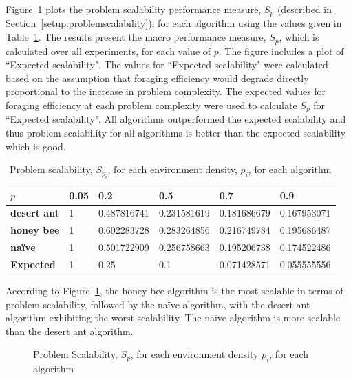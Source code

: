Figure~\ref{fig:problemscalability} plots the problem scalability performance measure, $S_p$ (described in Section~\ref{setup:problemscalability}), for each algorithm using the values given in Table~\ref{table:problemscalability}. The results present the macro performance measure, $S_p$, which is calculated over all experiments, for each value of $p$. The figure includes a plot of ``Expected scalability". The values for ``Expected scalability" were calculated based on the assumption that foraging efficiency would degrade directly proportional to the increase in problem complexity. The expected values for foraging efficiency at each problem complexity were used to calculate $S_p$ for ``Expected scalability". All algorithms outperformed the expected scalability and thus problem scalability for all algorithms is better than the expected scalability which is good. 


\begin{table}[!htbp]
    \centering
    \caption{Problem scalability, $S_{p_i}$, for each environment density, $p_i$, for each algorithm}
    \label{table:problemscalability}
    \begin{tabular}{@{}llllll@{}}
    \toprule
    \textbf{$p$}                  & \textbf{0.05} & \textbf{0.2        } & \textbf{0.5}         & \textbf{0.7}         & \textbf{0.9}         \\ \midrule
    \textbf{desert ant}           & 1    & 0.487816741 & 0.231581619 & 0.181686679 & 0.167953071 \\
    \textbf{honey bee}            & 1    & 0.602283728 & 0.283264856 & 0.216749784 & 0.195686487 \\
    \textbf{na\"ive}              & 1    & 0.501722909 & 0.256758663 & 0.195206738 & 0.174522486 \\
    \textbf{Expected} & 1    & 0.25        & 0.1         & 0.071428571 & 0.055555556 \\ \bottomrule
    \end{tabular}
\end{table}

According to Figure~\ref{fig:problemscalability}, the honey bee algorithm is the most scalable in terms of problem scalability, followed by the na\"ive algorithm, with the desert ant algorithm exhibiting the worst scalability. The na\"ive algorithm is more scalable than the desert ant algorithm. 


\begin{figure}[!htbp]
    \centering
    \resizebox{\textwidth}{!}{}
    \caption{Problem Scalability, $S_p$, for each environment density $p_i$, for each algorithm}
    \label{fig:problemscalability}
\end{figure}
    

